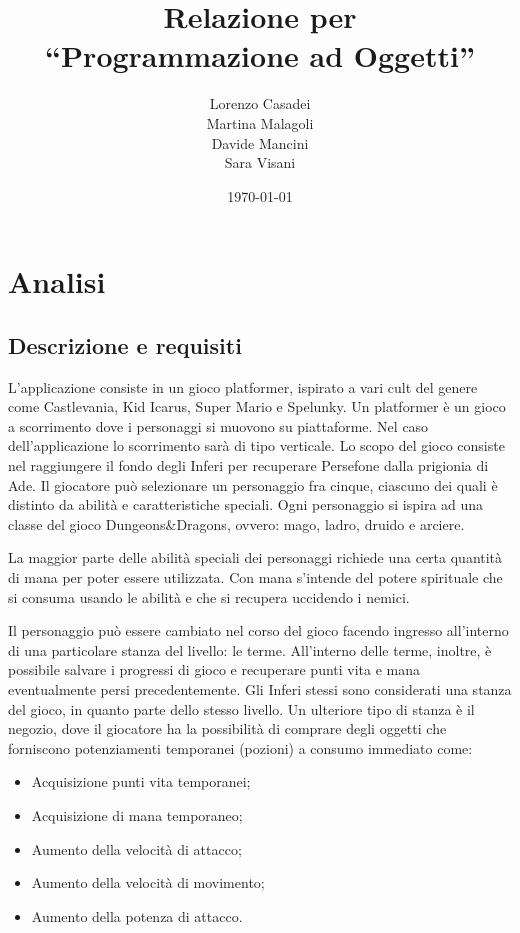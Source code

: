 \documentclass[a4paper,12pt]{report}
\title{Relazione per\\``Programmazione ad Oggetti''}
\author {
Lorenzo Casadei
\\Martina Malagoli
\\Davide Mancini
\\Sara Visani
}
\date{\today}
\begin{document}
\maketitle

\newpage

\tableofcontents

\chapter{Analisi}

\section{Descrizione e requisiti}

L’applicazione consiste in un gioco platformer, ispirato a vari cult del genere come Castlevania, Kid Icarus, Super Mario e Spelunky. Un platformer è un gioco a scorrimento dove i personaggi si muovono su piattaforme. Nel caso dell’applicazione lo scorrimento sarà di tipo verticale.
Lo scopo del gioco consiste nel raggiungere il fondo degli Inferi per recuperare Persefone dalla prigionia di Ade.
Il giocatore può selezionare un personaggio fra cinque, ciascuno dei quali è distinto da abilità e caratteristiche speciali. Ogni personaggio si ispira ad una classe del gioco Dungeons\&Dragons, ovvero: mago, ladro, druido e arciere.

La maggior parte delle abilità speciali dei personaggi richiede una certa quantità di mana per poter essere utilizzata. Con mana s’intende del potere spirituale che si consuma usando le abilità e che si recupera uccidendo i nemici.

Il personaggio può essere cambiato nel corso del gioco facendo ingresso all’interno di una particolare stanza del livello: le terme. All’interno delle terme, inoltre, è possibile salvare i progressi di gioco e recuperare punti vita e mana eventualmente persi precedentemente.
%
Gli Inferi stessi sono considerati una stanza del gioco, in quanto parte dello stesso livello.
Un ulteriore tipo di stanza è il negozio, dove il giocatore ha la possibilità di comprare degli oggetti che forniscono potenziamenti temporanei (pozioni) a consumo immediato come:

\begin{itemize}
    \item Acquisizione punti vita temporanei;
    \item Acquisizione di mana temporaneo;
    \item Aumento della velocità di attacco;
    \item Aumento della velocità di movimento;
    \item Aumento della potenza di attacco.
\end{itemize}
\end{document}
